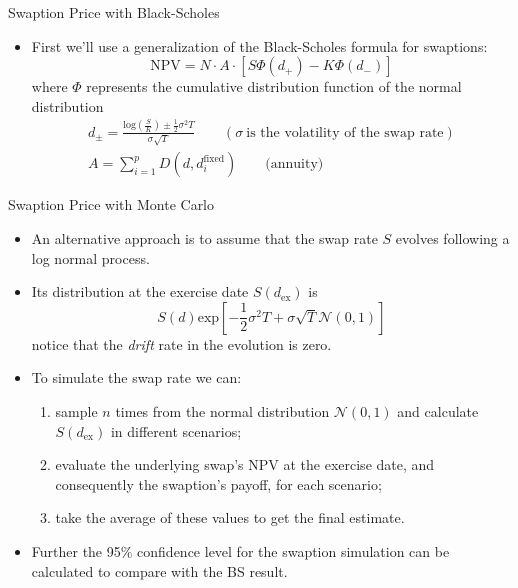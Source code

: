 \documentclass{beamer}
\begin{document}
\begin{frame}{Swaption Price with Black-Scholes}
    \begin{itemize}	
    \item First we'll use a generalization of the Black-Scholes formula for swaptions:
    \begin{equation*}
    \mathrm{NPV} = N\cdot A\cdot [S \Phi(d_+) - K\Phi(d_-)]
    \end{equation*}
    where $\Phi$ represents the cumulative distribution function of the normal distribution
    \begin{gather*}
    d_{\pm} = \frac{\mathrm{log}(\frac{S}{K}) \pm \frac{1}{2}\sigma^{2}T}{\sigma\sqrt{T}}\qquad(\sigma~\textrm{is the volatility of the swap rate})\\
    A =\sum_{i=1}^{p}D(d, d_{i}^{\mathrm{fixed}})\qquad\mathrm{(annuity})
    \end{gather*}
    \end{itemize}
\end{frame}

\begin{frame}{Swaption Price with Monte Carlo}
    \begin{itemize}
    \item An alternative approach is to assume that the swap rate $S$ evolves following a log normal process.
    \item Its distribution at the exercise date $S(d_{\mathrm{ex}})$ is
    \begin{equation*}
    S(d)\mathrm{exp}\left[-\frac{1}{2}\sigma^{2}T+\sigma\sqrt{T}\mathcal{N}(0,1)\right]	
    \end{equation*} 
	notice that the \emph{drift} rate in the evolution is zero.
    \item To simulate the swap rate we can:
    \begin{enumerate}
    \item sample $n$ times from the normal distribution $\mathcal{N}(0, 1)$ and calculate $S(d_{\mathrm{ex}})$ in different scenarios;
    \item evaluate the underlying swap's NPV at the exercise date, and consequently the swaption's payoff, for each scenario;
    \item take the average of these values to get the final estimate.
  	\end{enumerate} 
  	\item Further the 95\% confidence level for the swaption simulation can be calculated to compare with the BS result.
    \end{itemize}
\end{frame}
\end{document}
